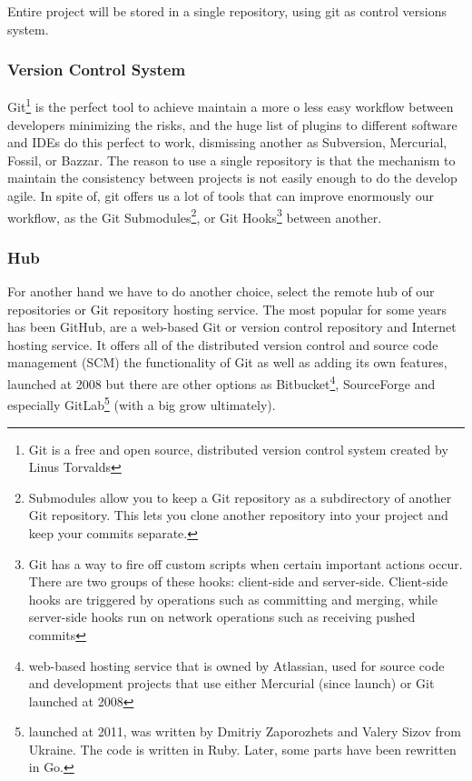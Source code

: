 Entire project will be stored in a single repository, using git as control
versions system.

\subsubsection{Version Control System}

Git\footnote{Git is a free and open source, distributed version control system
created by Linus Torvalds} is the perfect tool to achieve maintain a more o
less easy workflow between developers minimizing the risks, and the huge list of
plugins to different software and IDEs do this perfect to work, dismissing another
as Subversion, Mercurial, Fossil, or Bazzar.
\intro
The reason to use a single repository is that the mechanism to maintain the
consistency between projects is not easily enough to do the develop agile.
In spite of, git offers us a lot of tools that can improve enormously our
workflow, as the Git Submodules\footnote{Submodules allow you to keep a
Git repository as a subdirectory of another Git repository.
This lets you clone another repository into your project and keep your commits
separate.}, or Git Hooks\footnote{Git has a way to fire off custom scripts when
certain important actions occur. There are two groups of these hooks:
client-side and server-side. Client-side hooks are triggered by operations such
as committing and merging, while server-side hooks run on network operations
such as receiving pushed commits} between another.

\subsubsection{Hub}

For another hand we have to do another choice, select the remote hub of our repositories
or Git repository hosting service. The most popular for some years has been GitHub,
are a web-based Git or version control repository and Internet hosting service.
It offers all of the distributed version control and source code management (SCM)
the functionality of Git as well as adding its own features,
launched at 2008
but there are other options as Bitbucket\footnote{web-based hosting service
that is owned by Atlassian, used for source code and development projects that
use either Mercurial (since launch) or Git
launched at 2008},
SourceForge and especially
GitLab\footnote{launched at 2011, was written by Dmitriy Zaporozhets and Valery
Sizov from Ukraine. The code is written in Ruby. Later, some parts have been
rewritten in Go.} (with a big grow ultimately).



